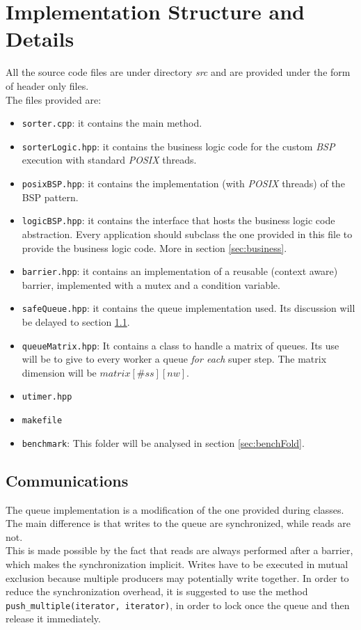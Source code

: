 \documentclass[]{article}
\def\code#1{\texttt{#1}}
\begin{document}
\section{Implementation Structure and Details}
\label{sec:implDetails}

All the source code files are under directory \emph{src} and are provided under the form of header only files. \\The files provided are:
\begin{itemize}
	\item \code{sorter.cpp}: it contains the main method. 
	\item \code{sorterLogic.hpp}: it contains the business logic code for the custom \emph{BSP} execution with standard \emph{POSIX} threads.
	\item \code{posixBSP.hpp}: it contains the implementation (with \emph{POSIX} threads) of the BSP pattern.
	\item \code{logicBSP.hpp}: it contains the interface that hosts the business logic code abstraction. Every application should subclass the one provided in this file to provide the business logic code. More in section \ref{sec:business}.
	\item \code{barrier.hpp}: it contains an implementation of a reusable (context aware) barrier, implemented with a mutex and a condition variable.
	\item \code{safeQueue.hpp}: it contains the queue implementation used. Its discussion will be delayed to section \ref{sec:queue}.
	\item \code{queueMatrix.hpp}: It contains a class to handle a matrix of queues. Its use will be to give to every worker a queue \emph{for each} super step. The matrix dimension will be $matrix[\#\mathit{ss}][\mathit{nw}]$.
	\item \code{utimer.hpp}
	\item \code{makefile}
	\item \code{benchmark}: This folder will be analysed in section \ref{sec:benchFold}.
\end{itemize}

\subsection{Communications}
\label{sec:queue}
The queue implementation is a modification of the one provided during classes. The main difference is that writes to the queue are synchronized, while reads are not. \\ This is made possible by the fact that reads are always performed after a barrier, which makes the synchronization implicit. Writes have to be executed in mutual exclusion because multiple producers may potentially write together. In order to reduce the synchronization overhead, it is suggested to use the method \code{push\_multiple(iterator, iterator)}, in order to lock once the queue and then release it immediately.
\end{document}
